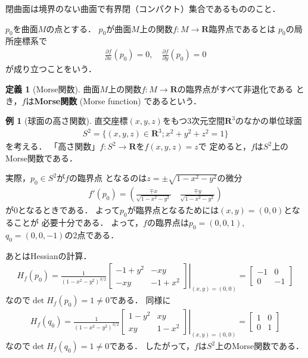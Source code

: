 \documentclass[11pt, a4paper, dvipdfmx]{jsarticle}
\theoremstyle{definition}
\newcommand{\rr}{\mathbf{R}}
\newcommand{\p}{\partial}
\theoremstyle{mystyle}
\newtheorem{DFN}[Axiom]{定義}
\newtheorem{EG}[Axiom]{例}
\numberwithin{equation}{section} %
\begin{document}
閉曲面は境界のない曲面で有界閉（コンパクト）集合であるもののこと．

$p_0$を曲面$M$の点とする．
$p_0$が曲面$M$上の関数$f\colon M\to\rr$臨界点であるとは
$p_0$の局所座標系で
\begin{align}
    \frac{\p f}{\p x}(p_0)=0,\quad 
    \frac{\p f}{\p y}(p_0)=0
\end{align}
が成り立つことをいう．

\begin{DFN}[Morse関数]
    曲面$M$上の関数$f\colon M\to \rr$の臨界点がすべて非退化である
    とき，$f$は\textbf{Morse関数} (Morse function) であるという．
\end{DFN}

\begin{EG}[球面の高さ関数]
    直交座標$(x,y,z)$をもつ3次元空間$\rr^3$のなかの単位球面
    \begin{align}
        S^2=\{(x,y,z)\in\rr^3; x^2+y^2+z^2=1\}
    \end{align}
    を考える．
    「高さ関数」$f\colon S^2\to\rr$を$f(x,y,z)=z$で
    定めると，$f$は$S^2$上のMorse関数である．

    実際，$p_0\in S^2$が$f$の臨界点
    となるのは$z=\pm \sqrt{1-x^2-y^2}$の微分
    \begin{align*}
        f'(p_0)=\left(\frac{\mp x}{\sqrt{1-x^2-y^2}}\quad \frac{\mp y}{\sqrt{1-x^2-y^2}}\right)
    \end{align*}
    が0となるときである．
    よって$p_0$が臨界点となるためには$(x,y)=(0,0)$となることが
    必要十分である．
    よって，$f$の臨界点は$p_0=(0,0,1)$, $q_0=(0,0,-1)$の2点である．
    
    あとはHessianの計算．
    \begin{align*}
        H_f(p_0)=
        \frac{1}{(1-x^2-y^2)^{3/2}}
        \left.\begin{bmatrix*}
            -1+y^2 & -xy\\
            -xy & -1+x^2
        \end{bmatrix*}
        \right|_{(x,y)=(0,0)}
        =\begin{bmatrix*}
            -1&0\\0&-1
        \end{bmatrix*}
    \end{align*}
    なので$\det H_f(p_0)=1\neq 0$である．
    同様に
    \begin{align*}
        H_f(q_0)=
        \frac{1}{(1-x^2-y^2)^{3/2}}
        \left.\begin{bmatrix*}
            1-y^2 & xy\\
            xy & 1-x^2
        \end{bmatrix*}
        \right|_{(x,y)=(0,0)}
        =\begin{bmatrix*}
            1&0\\0&1
        \end{bmatrix*}
    \end{align*}
    なので$\det H_f(q_0)=1\neq 0$である．
    したがって，$f$は$S^2$上のMorse関数である．
\end{EG}
\end{document}
